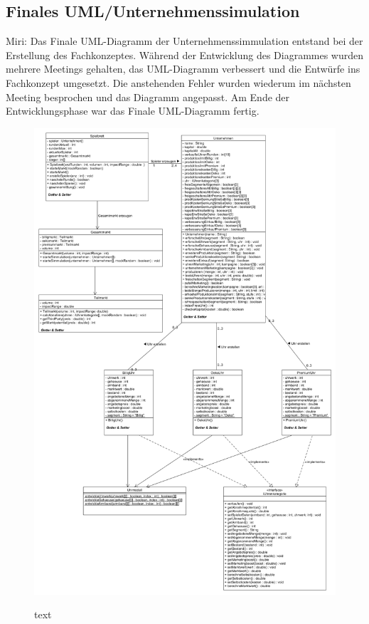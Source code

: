 \subsection{Finales UML/Unternehmenssimulation}
Miri: Das Finale UML-Diagramm der Unternehmenssimmulation entstand bei der Erstellung des Fachkonzeptes. Während der Entwicklung des Diagrammes wurden mehrere Meetings gehalten, das UML-Diagramm verbessert und die Entwürfe ins Fachkonzept umgesetzt. Die anstehenden Fehler wurden wiederum im nächsten Meeting besprochen und das Diagramm angepasst. Am Ende der Entwicklungsphase war das Finale UML-Diagramm fertig.
\begin{figure} [!h]
	\centering
	\includegraphics[scale=0.36]{img/Unternehmenssimmulation_final.png} 
	\label{UML-Final}
	\caption{text}
\end{figure}
\clearpage
